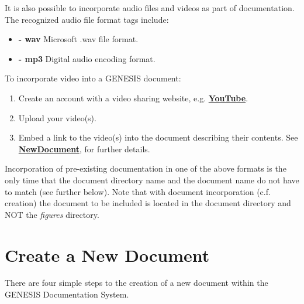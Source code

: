 \documentclass[12pt]{article}
\begin{document}
It is also possible to incorporate audio files and videos as part of documentation. The recognized audio file format tags include:

\begin{itemize}

\item[]{\bf - wav} Microsoft .wav file format.
\item[]{\bf - mp3} Digital audio encoding format.

\end{itemize}

To incorporate video into a GENESIS document: 

\begin{enumerate}
   \item Create an account with a video sharing website, e.g. \href{http://www.youtube.com/create_account}{\bf YouTube}.
   \item Upload your video(s).
   \item Embed a link to the video(s) into the document describing their contents. See \href{../NewDocument/NewDocument.tex}{\bf NewDocument}, for further details.
\end{enumerate}

Incorporation of pre-existing documentation in one of the above formats is the only time that the document directory name and the document name do not have to match (see further below). Note that with document incorporation (c.f. creation) the document to be included is located in the document directory and NOT the {\it figures} directory.
 
\section*{Create a New Document}

There are four simple steps to the creation of a new document within the GENESIS Documentation System.
\end{document}
